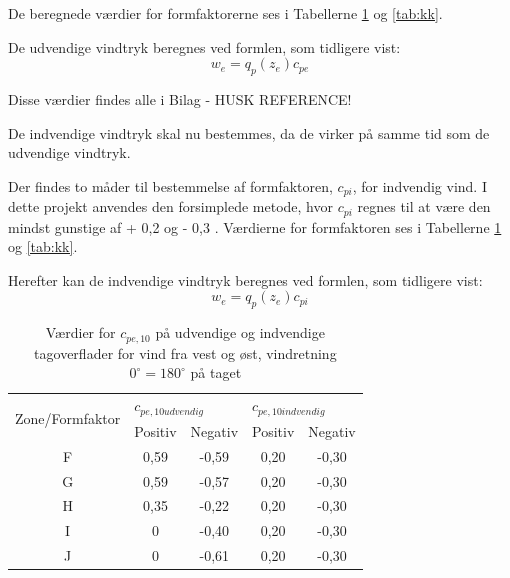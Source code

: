 De beregnede værdier for formfaktorerne ses i Tabellerne \ref{tab:cc} og \ref{tab:kk}. 


De udvendige vindtryk beregnes ved formlen, som tidligere vist:
\begin{equation} 
	w_e=q_p(z_e)c_{pe}
\end{equation}

Disse værdier findes alle i Bilag - HUSK REFERENCE! 


De indvendige vindtryk skal nu bestemmes, da de virker på samme tid som de udvendige vindtryk.


Der findes to måder til bestemmelse af formfaktoren, $c_{pi}$, for indvendig vind. I dette projekt anvendes den forsimplede metode, hvor $c_{pi}$ regnes til at være den mindst gunstige af + 0,2 og - 0,3 \citep[Kapitel 7]{EU91}. Værdierne for formfaktoren ses i Tabellerne \ref{tab:cc} og \ref{tab:kk}.


Herefter kan de indvendige vindtryk beregnes ved formlen, som tidligere vist:
\begin{equation} 
	w_e=q_p(z_e)c_{pi}
\end{equation}

\begin{table}[htb]
	\begin{center}
		\begin{tabular}{ c c c c c } 
			\hline
			\multirow{2}{*}{Zone/Formfaktor} & \multicolumn{2}{l}{$c_{pe,10 udvendig}$} & \multicolumn{2}{l}{$c_{pe,10 indvendig}$} \\ 
			& Positiv & Negativ & Positiv & Negativ \\ \hline
			F & 0,59 & -0,59 & 0,20 & -0,30 \\
			G & 0,59 & -0,57 & 0,20 & -0,30 \\
			H & 0,35 & -0,22 & 0,20 & -0,30 \\ 
			I & 0 & -0,40 & 0,20 & -0,30 \\	
			J & 0 & -0,61 & 0,20 & -0,30 \\	
		\end{tabular}
		\caption{Værdier for $c_{pe,10}$ på udvendige og indvendige tagoverflader for vind fra vest og øst, vindretning $0^{\circ} = 180^{\circ}$ på taget}
		\label{tab:cc}
	\end{center}
\end{table}

